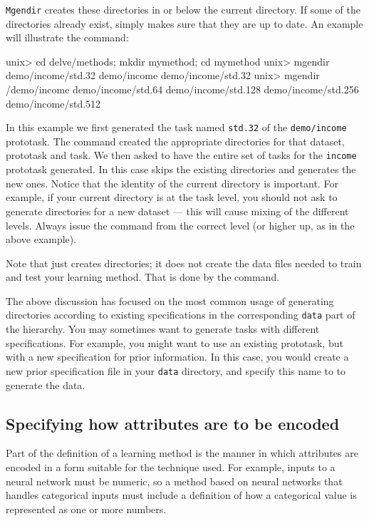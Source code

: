 \texttt{Mgendir} creates these directories in or below the current
directory. If some of the directories already exist, \mgendir{} simply
makes sure that they are up to date.  An example will illustrate the
command:

\begin{Session}
unix> cd delve/methods; mkdir mymethod; cd mymethod
unix> mgendir demo/income/std.32
demo/income
demo/income/std.32
unix> mgendir /demo/income
demo/income/std.64
demo/income/std.128
demo/income/std.256
demo/income/std.512
\end{Session}

In this example we first generated the task named \texttt{std.32} of
the \texttt{demo/income} prototask. The \mgendir{} command created the
appropriate directories for that dataset, prototask and task. We then
asked to have the entire set of tasks for the \texttt{income}
prototask generated. In this case \mgendir{} skips the existing
directories and generates the new ones. Notice that the identity of
the current directory is important.  For example, if your current
directory is at the task level, you should not ask \mgendir{} to
generate directories for a new dataset --- this will cause mixing of
the different levels. Always issue the \mgendir{} command from the
correct level (or higher up, as in the above example).

Note that \mgendir{} just creates directories; it does not create the
data files needed to train and test your learning method.  That is
done by the \mgendata{} command.

The above discussion has focused on the most common usage of
generating directories according to existing specifications in the
corresponding \texttt{data} part of the \delve{} hierarchy. You may
sometimes want to generate tasks with different specifications.  For
example, you might want to use an existing prototask, but with a new
specification for prior information. In this case, you would create a
new prior specification file in your \texttt{data} directory, and
specify this name to \mgendir{} to generate the data.


\subsection{Specifying how attributes are to be encoded}
\label{assess-encodings}

Part of the definition of a learning method is the manner in which
attributes are encoded in a form suitable for the technique used.  For
example, inputs to a neural network must be numeric, so a method
based on neural networks that handles categorical inputs must include
a definition of how a categorical value is represented as one or more
numbers.

